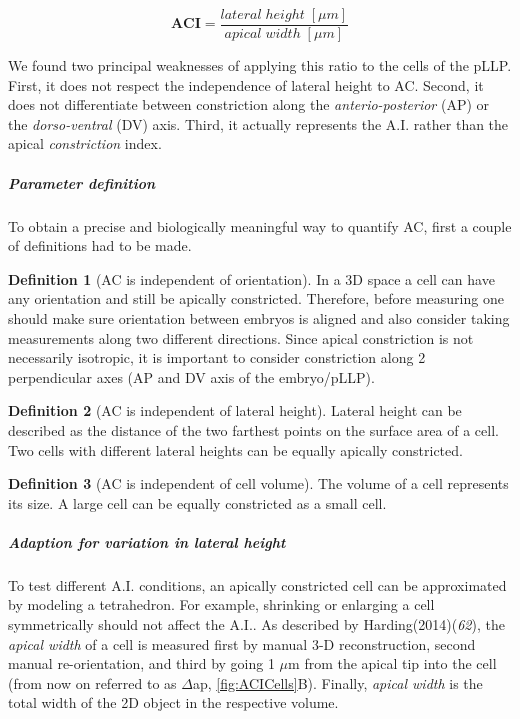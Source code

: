 \documentclass[11pt,singlespacinge,twoside]{reedthesis} %
\theoremstyle{definition}
\newtheorem{definition}{Definition}[chapter]
\theoremstyle{definition}
\theoremstyle{definition}
\theoremstyle{remark}
\begin{document}
\[\mathbf{ACI} = \frac{lateral\;height\;[\mu m]}{apical\;width\;[\mu m]}\]

\noindent We found two principal weaknesses of applying this ratio to the cells of the pLLP. First, it does not respect the independence of lateral height to AC. Second, it does not differentiate between constriction along the \emph{anterio-posterior} (AP) or the \emph{dorso-ventral} (DV) axis. Third, it actually represents the A.I. rather than the apical \emph{constriction} index.

\hypertarget{ACI-param}{%
\subparagraph{Parameter definition}\label{ACI-param}}

To obtain a precise and biologically meaningful way to quantify AC, first a couple of definitions had to be made.
\begin{definition}[AC is independent of orientation]
\protect\hypertarget{def:unnamed-chunk-3}{}{\label{def:unnamed-chunk-3} {} }In a 3D space a cell can have any orientation and still be apically constricted. Therefore, before measuring one should make sure orientation between embryos is aligned and also consider taking measurements along two different directions. Since apical constriction is not necessarily isotropic, it is important to consider constriction along 2 perpendicular axes (AP and DV axis of the embryo/pLLP).
\end{definition}
\begin{definition}[AC is independent of lateral height]
\protect\hypertarget{def:unnamed-chunk-4}{}{\label{def:unnamed-chunk-4} {} }Lateral height can be described as the distance of the two farthest points on the surface area of a cell. Two cells with different lateral heights can be equally apically constricted.
\end{definition}
\begin{definition}[AC is independent of cell volume]
\protect\hypertarget{def:unnamed-chunk-5}{}{\label{def:unnamed-chunk-5} {} }The volume of a cell represents its size. A large cell can be equally constricted as a small cell.
\end{definition}
\hypertarget{ACI-lat}{%
\subparagraph{Adaption for variation in lateral height}\label{ACI-lat}}

To test different A.I. conditions, an apically constricted cell can be approximated by modeling a tetrahedron. For example, shrinking or enlarging a cell symmetrically should not affect the A.I.. As described by Harding(2014)(\emph{62}), the \emph{apical width} of a cell is measured first by manual 3-D reconstruction, second manual re-orientation, and third by going 1 \(\mu\)m from the apical tip into the cell (from now on referred to as \(\Delta\)ap, \ref{fig:ACICells}B). Finally, \emph{apical width} is the total width of the 2D object in the respective volume.
\end{document}
